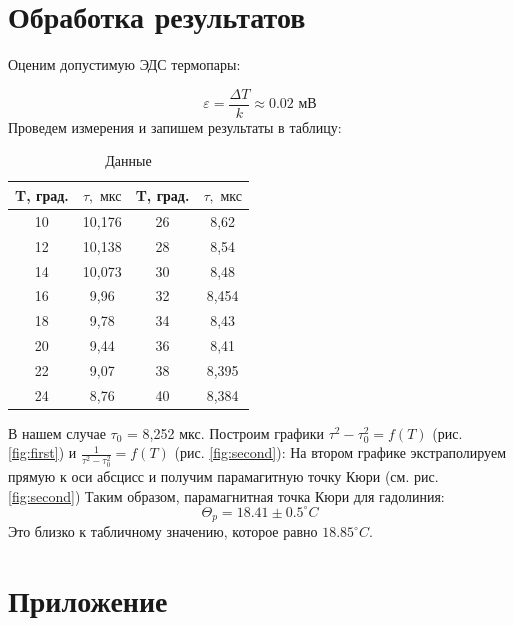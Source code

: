 \documentclass[a4paper, 12pt]{article}
\begin{document}
\section{Обработка результатов}

Оценим допустимую ЭДС термопары:

\begin{equation}
	\varepsilon = \frac{\Delta T}{k} \approx 0.02 \text{ мВ}
\end{equation}
Проведем измерения и запишем результаты в таблицу:

\begin{table}[H]
	\centering
	\begin{tabular}{|c|c|c|c|}
	\hline
	T, град. & $\tau, \text{ мкс}$ & \multicolumn{1}{l|}{T, град.} & \multicolumn{1}{l|}{$\tau, \text{ мкс}$} \\ \hline
	10       & 10,176    & 26                     & 8,62                   \\ \hline
	12       & 10,138    & 28                     & 8,54                   \\ \hline
	14       & 10,073    & 30                     & 8,48                   \\ \hline
	16       & 9,96      & 32                     & 8,454                  \\ \hline
	18       & 9,78      & 34                     & 8,43                   \\ \hline
	20       & 9,44      & 36                     & 8,41                   \\ \hline
	22       & 9,07      & 38                     & 8,395                  \\ \hline
	24       & 8,76      & 40                     & 8,384                  \\ \hline
	\end{tabular}
	\caption{Данные}
	\label{tab:data}
\end{table}
В нашем случае $\tau_0$ = 8,252 мкс.
Построим графики $\tau^2 - \tau_0^2 = f(T)$ (рис. \ref{fig:first}) и $\frac{1}{\tau^2 - \tau_0^2} = f(T)$ (рис. \ref{fig:second}):
На втором графике экстраполируем прямую к оси абсцисс и получим парамагитную точку Кюри (см. рис. \ref{fig:second})
Таким образом, парамагнитная точка Кюри для гадолиния:
\begin{equation}
	\Theta_p = 18.41 \pm 0.5 ^\circ C
\end{equation}
Это близко к табличному значению, которое равно $18.85 ^\circ C$.

\section{Приложение}
\end{document}

